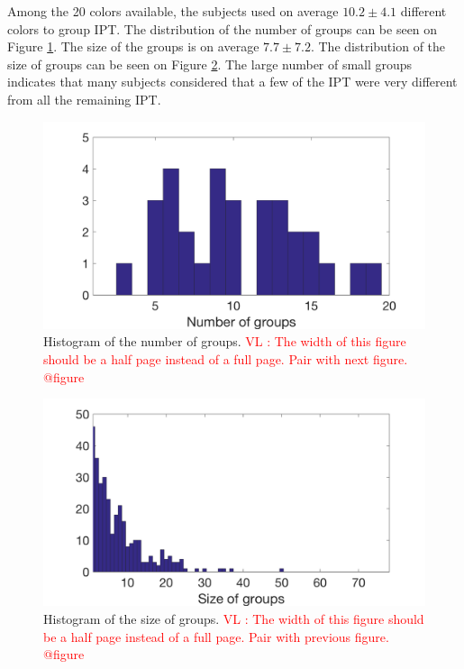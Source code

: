 \documentclass{article}
\newcommand{\ipt}{IPT\xspace}
\newcommand{\vl}[1]{\textcolor{red}{VL : #1}}
\begin{document}
Among the 20 colors available, the subjects used on average $10.2 \pm  4.1$ different colors to group \ipt. The distribution of the number of groups can be seen on Figure \ref{fig:xp2nbGroup}. The size of the groups is on average $7.7 \pm   7.2$. The distribution of the size of groups can be seen on Figure \ref{fig:xp2sizeGroup}. The large number of small groups indicates that many subjects considered that a few of the \ipt were very different from all the remaining \ipt.

\begin{figure}
\center
\includegraphics[width = \textwidth]{figures/nbc.png}
\caption{Histogram of the number of groups.
\vl{The width of this figure should be a half page instead of a full page. Pair with next figure. @figure}}
\label{fig:xp2nbGroup}
\end{figure}

\begin{figure}
\center
\includegraphics[width = \textwidth]{figures/sbc.png}
\caption{Histogram of the size of groups.
\vl{The width of this figure should be a half page instead of a full page. Pair with previous figure. @figure}}
\label{fig:xp2sizeGroup}
\end{figure}
\end{document}
